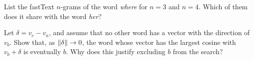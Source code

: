 \begin{notechapter}
\begin{exercise}\label{word-embeddings:exr:4}
List the fastText $n$-grams of the word \emph{where} for $n = 3$ and $n = 4$. Which of them does it share with the word
\emph{her}?
\end{exercise}

\begin{exercise}\label{word-embeddings:exr:5}
Let $\delta = v_c - v_a$, and assume that no other word has a vector with the direction of $v_b$. Show that, as
$\left\|\delta\right\|\to0$, the word whose vector has the largest cosine with $v_b + \delta$ is eventually $b$. Why does this justify
excluding $b$ from the search?
\end{exercise}
\end{notechapter}
